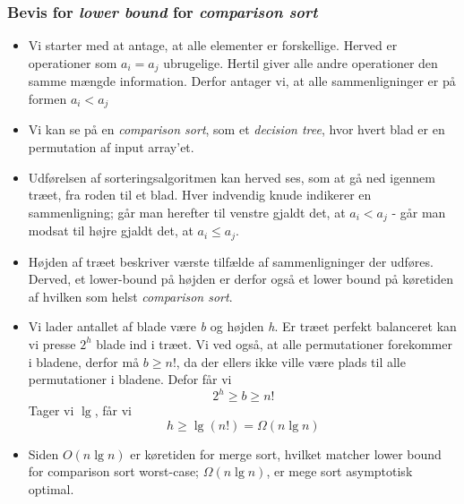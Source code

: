 \documentclass{article}
\begin{document}
\subsubsection*{Bevis for \textit{lower bound} for \textit{comparison sort}}
\begin{itemize}
    \item Vi starter med at antage, at alle elementer er forskellige. Herved er operationer som $a_i = a_j$ ubrugelige. Hertil giver alle andre operationer den samme mængde information. Derfor antager vi, at alle sammenligninger er på formen $a_i < a_j$
    \item Vi kan se på en \textit{comparison sort}, som et \textit{decision tree}, hvor hvert blad er en permutation af input array'et.
    \item Udførelsen af sorteringsalgoritmen kan herved ses, som at gå ned igennem træet, fra roden til et blad. Hver indvendig knude indikerer en sammenligning; går man herefter til venstre gjaldt det, at $a_i < a_j$ - går man modsat til højre gjaldt det, at $a_i \leq a_j$.
    \item Højden af træet beskriver værste tilfælde af sammenligninger der udføres. Derved, et lower-bound på højden er derfor også et lower bound på køretiden af hvilken som helst \textit{comparison sort}.
    \item Vi lader antallet af blade være \textit{b} og højden \textit{h}. Er træet perfekt balanceret kan vi presse $2^h$ blade ind i træet. Vi ved også, at alle permutationer forekommer i bladene, derfor må $b \geq n!$, da der ellers ikke ville være plads til alle permutationer i bladene. Defor får vi
    $$2^h \geq b \geq n!$$
    Tager vi $\lg$, får vi
    $$h \geq \lg(n!) = \Omega(n \lg n)$$
    \item Siden $O(n \lg n)$ er køretiden for merge sort, hvilket matcher lower bound for comparison sort worst-case; $\Omega(n \lg n)$, er mege sort asymptotisk optimal.
\end{itemize}
\end{document}
